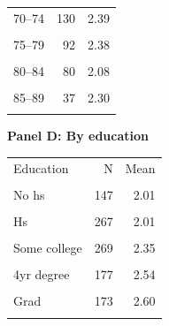\begin{table}[htbp]
\begin{minipage}[t]{0.48\textwidth}
\begin{tabular}{lrr}
70--74 & 130 & 2.39 \\\\
75--79 & 92 & 2.38 \\\\
80--84 & 80 & 2.08 \\\\
85--89 & 37 & 2.30 \\\\
\bottomrule\end{tabular}
\end{minipage}
\hfill
\begin{minipage}[t]{0.48\textwidth}\centering
\textbf{Panel D: By education}\\[0.3em]
\begin{tabular}{lrr}\toprule
Education & N & Mean \\\\ \midrule
No hs & 147 & 2.01 \\\\
Hs & 267 & 2.01 \\\\
Some college & 269 & 2.35 \\\\
4yr degree & 177 & 2.54 \\\\
Grad & 173 & 2.60 \\\\
\bottomrule\end{tabular}
\end{minipage}
\end{table}
